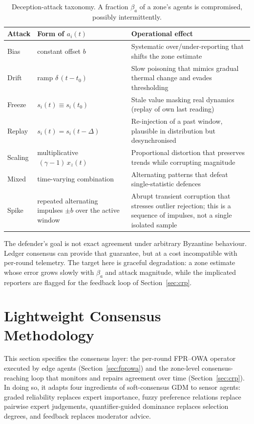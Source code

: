 \documentclass[smartcities,article,submit,moreauthors]{Definitions/mdpi}
\begin{document}
\begin{table}[H]
\centering
\caption{Deception-attack taxonomy. A fraction $\beta_a$ of a zone's
agents is compromised, possibly intermittently.}
\label{tab:attacks}
\footnotesize
\begin{tabularx}{\textwidth}{P{0.13\textwidth}P{0.29\textwidth}Y}
\toprule
\textbf{Attack} & \textbf{Form of $a_i(t)$} & \textbf{Operational
effect} \\
\midrule
Bias & constant offset $b$ & Systematic over/under-reporting that
shifts the zone estimate \\
Drift & ramp $\delta\,(t-t_0)$ & Slow poisoning that mimics gradual
thermal change and evades thresholding \\
Freeze & $s_i(t)\equiv s_i(t_0)$ & Stale value masking real dynamics
(replay of own last reading) \\
Replay & $s_i(t)=s_i(t-\Delta)$ & Re-injection of a past window,
plausible in distribution but desynchronised \\
Scaling & multiplicative $\,(\gamma-1)\,x_z(t)$ & Proportional
distortion that preserves trends while corrupting magnitude \\
Mixed & time-varying combination & Alternating patterns that defeat
single-statistic defences \\
Spike & repeated alternating impulses $\pm b$ over the active window &
Abrupt transient corruption that stresses outlier rejection; this is a
sequence of impulses, not a single isolated sample \\
\bottomrule
\end{tabularx}
\end{table}

The defender's goal is not exact agreement under arbitrary Byzantine
behaviour. Ledger consensus can provide that guarantee, but at a cost
incompatible with per-round telemetry. The target here is graceful
degradation: a zone estimate whose error grows slowly with $\beta_a$ and
attack magnitude, while the implicated reporters are flagged for the
feedback loop of Section~\ref{sec:crp}.

\section{Lightweight Consensus Methodology}
\label{sec:methodology}

This section specifies the consensus layer: the per-round FPR--OWA
operator executed by edge agents (Section~\ref{sec:fprowa}) and the
zone-level consensus-reaching loop that monitors and repairs agreement
over time (Section~\ref{sec:crp}). In doing so, it adapts four
ingredients of soft-consensus GDM to sensor agents: graded reliability
replaces expert importance, fuzzy preference relations replace pairwise
expert judgements, quantifier-guided dominance replaces selection
degrees, and feedback replaces moderator advice.
\end{document}

